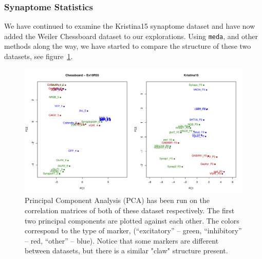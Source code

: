 \documentclass[simplex.tex]{subfiles}
\begin{document}
\subsubsection{Synaptome Statistics}

We have continued to examine the Kristina15 synaptome dataset and have
now added the Weiler Chessboard dataset to our explorations.  Using 
\verb+meda+, and other methods along the way, we have started to compare
the structure of these two datasets, see figure~\ref{fig:synClaw}.  

\begin{figure}[h!]
\begin{cframed}
\centering
\includegraphics[width=\textwidth]{./figs/2dProjClaw.pdf}
\caption{
  Principal Component Analysis (PCA) has been run on the correlation
  matrices of both of these dataset respectively.  The first two
  principal components are plotted against each other.  The colors
  correspond to the type of marker, (``excitatory'' -- green,
  ``inhibitory'' -- red, ``other'' -- blue).  Notice that some markers are
  different between datasets, but there is a similar "claw" structure
  present. 
}
\label{fig:synClaw}
\end{cframed}
\end{figure}
\end{document}
